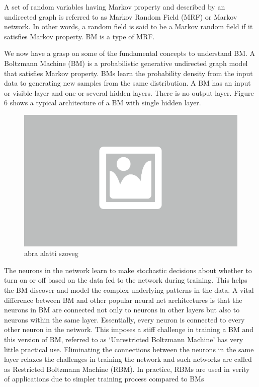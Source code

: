 A set of random variables having Markov property and described by an undirected graph is referred to as Markov Random Field (MRF) or Markov network. In other words, a random field is said to be a Markov random field if it satisfies Markov property. BM is a type of MRF.

We now have a grasp on some of the fundamental concepts to understand BM. A Boltzmann Machine (BM) is a probabilistic generative undirected graph model that satisfies Markov property. BMs learn the probability density from the input data to generating new samples from the same distribution.  A BM has an input or visible layer and one or several hidden layers. There is no output layer. Figure 6 shows a typical architecture of a BM with single hidden layer. 

\begin{figure}[ht]
	\centering
	\includegraphics[width=0.65\columnwidth]{figures/abra.png}
	\caption{abra alatti szoveg}
\end{figure}

The neurons in the network learn to make stochastic decisions about whether to turn on or off based on the data fed to the network during training.  This helps the BM discover and model the complex underlying patterns in the data. A vital difference between BM and other popular neural net architectures is that the neurons in BM are connected not only to neurons in other layers but also to neurons within the same layer. Essentially, every neuron is connected to every other neuron in the network.  This imposes a stiff challenge in training a BM and this version of BM, referred to as ‘Unrestricted Boltzmann Machine’ has very little practical use. Eliminating the connections between the neurons in the same layer relaxes the challenges in training the network and such networks are called as Restricted Boltzmann Machine (RBM). In practice, RBMs are used in verity of applications due to simpler training process compared to BMs

